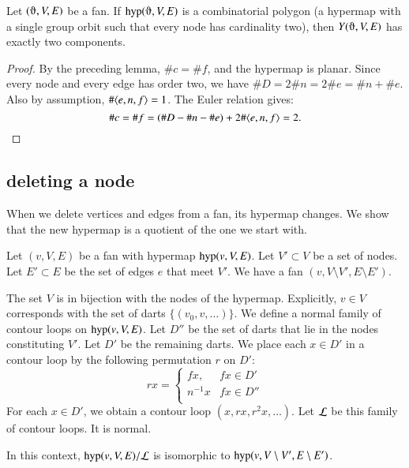 \begin{lemma}
Let $(\orgn,V,E)$ be a fan.
If $\op{hyp}(\orgn,V,E)$ is a combinatorial polygon (a
 hypermap with a single group orbit such that every node has cardinality two), then
$Y(\orgn,V,E)$ has exactly two components.
\end{lemma}

\begin{proof} By the preceding lemma, $\# c = \#f$, and the
hypermap is planar.  Since every node and every edge has order two,
we have $\#D = 2\#n = 2\# e = \#n +\#e$.  Also by assumption,
$\#\langle e,n,f\rangle = 1$.  The Euler relation gives:
    $$
    \#c = \#f = (\#D - \#n - \#e) + 2\#\langle e,n,f\rangle =2.
    $$
\end{proof}



\subsection{deleting a node}


When we delete vertices and edges from a fan, its hypermap
changes.  We show that the new hypermap is a quotient
of the one we start with.

Let $(v,V,E)$ be a fan with hypermap ${\operatorname{hyp}}(v,V,E)$.
Let $V'\subset V$ be a set of nodes. 
Let $E'\subset E$ be the set of edges $e$ that meet $V'$.
We have a fan $(v,V\setminus V',E\setminus E')$.

The set $V$ is in bijection with the nodes of the hypermap.
Explicitly, $v\in V$ corresponds with the set of darts
 $\{(v_0,v,\ldots)\}$.
We define a normal family of contour loops on 
${\operatorname{hyp}}(v,V,E)$.  Let $D''$ be the set of darts that lie in the
nodes constituting $V'$.  Let $D'$ be the remaining darts.
We place each $x\in D'$ in a contour
loop by the following permutation $r$ on $D'$:
    $$r x =
    \begin{cases}
    f x, & f x \in D'\\
    n^{-1} x & f x \in D''\\
    \end{cases}
    $$
For each $x\in D'$, we obtain a contour loop $(x,r x, r^2 x,\ldots)$.
Let $\cal L$ be this family of contour loops.  It is normal.

\begin{lemma}
In this context,
$\op{hyp}(v,V,E)/{\cal L}$ is isomorphic to 
${\operatorname{hyp}}(v,V\setminus V',E\setminus E')$.
\end{lemma}

